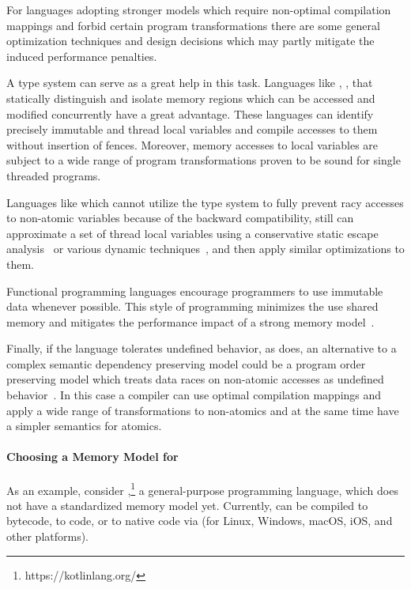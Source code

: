 For languages adopting stronger models which require non-optimal
compilation mappings and forbid certain program transformations
there are some general optimization techniques and design decisions
which may partly mitigate the induced performance penalties.

A type system can serve as a great help in this task. 
Languages like \Haskell, \OCaml, \Rust that 
statically distinguish and isolate memory regions 
which can be accessed and modified concurrently have a great advantage.
These languages can identify precisely 
immutable and thread local variables
and compile accesses to them without insertion of fences.
Moreover, memory accesses to local variables are subject to 
a wide range of program transformations proven to be
sound for single threaded programs. 
 
Languages like \Java which cannot utilize the type system 
to fully prevent racy accesses to non-atomic variables 
because of the backward compatibility, still can 
approximate a set of thread local variables    
using a conservative static escape analysis~\cite{Choi-al:OOPSLA1999}
or various dynamic techniques~\cite{Liu-al:PLDI19},
and then apply similar optimizations to them. 

Functional programming languages encourage 
programmers to use immutable data whenever possible.
This style of programming minimizes the use 
shared memory and mitigates the performance impact 
of a strong memory model~\cite{Vollmer-al:PPoPP17}. 

Finally, if the language tolerates undefined behavior, as \CPP does, 
an alternative to a complex semantic dependency preserving model
could be a program order preserving model 
which treats data races on non-atomic accesses as 
undefined behavior~\cite{Boehm-Demsky:MSPC14, Ou-Demsky:OOPSLA18}.
In this case a compiler can use optimal compilation mappings 
and apply a wide range of transformations to non-atomics 
and at the same time have a simpler semantics for atomics.

\paragraph{Choosing a Memory Model for \Kotlin}
As an example, %
consider \Kotlin,\footnote{https://kotlinlang.org/}
a general-purpose programming language,
which does not have a standardized memory model yet.
Currently, \Kotlin can be compiled 
to \Java bytecode, to \JS code, or to native code via \LLVM
(for Linux, Windows, macOS, iOS, and other platforms).


